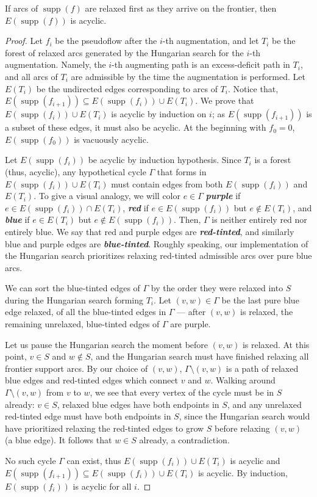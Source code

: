 \documentclass[a4paper,UKenglish]{socg-lipics-v2018}
\def\etal{\emph{et~al.}}
\def\etal{\textit{et~al.}}
\def\supp{\operatorname{supp}}
\theoremstyle{plain}
\numberwithin{figure}{section}
\def\EMPH#1{\textbf{\emph{\boldmath #1}}}
\begin{document}
\begin{lemmarep}[(Agarwal~\etal~\cite{AFPVX17})]
\label{lemma:orlin_acyclic}
If arcs of $\supp(f)$ are relaxed first as they arrive on the frontier, then
$E(\supp(f))$ is acyclic.
\end{lemmarep}

\begin{proof}
Let $f_i$ be the pseudoflow after the $i$-th augmentation, and let $T_i$ be the
forest of relaxed arcs generated by the Hungarian search for the $i$-th
augmentation.
Namely, the $i$-th augmenting path is an excess-deficit path in $T_i$, and all
arcs of $T_i$ are admissible by the time the augmentation is performed.
Let $E(T_i)$ be the undirected edges corresponding to arcs of $T_i$.
Notice that, $E(\supp(f_{i+1})) \subseteq E(\supp(f_i)) \cup E(T_i)$.
We prove that $E(\supp(f_i)) \cup E(T_i)$ is acyclic by induction on $i$;
as $E(\supp(f_{i+1}))$ is a subset of these edges, it must also be acyclic.
At the beginning with $f_0 = 0$, $E(\supp(f_0))$ is vacuously acyclic.

Let $E(\supp(f_i))$ be acyclic by induction hypothesis.
Since $T_i$ is a forest (thus, acyclic), any hypothetical cycle $\Gamma$ that
forms in $E(\supp(f_i)) \cup E(T_i)$ must contain edges from both
$E(\supp(f_i))$ and $E(T_i)$.
To give a visual analogy, we will color $e \in \Gamma$
\EMPH{purple} if $e \in E(\supp(f_i)) \cap E(T_i)$,
\EMPH{red} if $e \in E(\supp(f_i))$ but $e \not\in E(T_i)$,
and \EMPH{blue} if $e \in E(T_i)$ but $e \not\in E(\supp(f_i))$.
Then, $\Gamma$ is neither entirely red nor entirely blue.
We say that red and purple edges are \EMPH{red-tinted}, and similarly blue and
purple edges are \EMPH{blue-tinted}.
Roughly speaking, our implementation of the Hungarian search prioritizes
relaxing red-tinted admissible arcs over pure blue arcs. %

We can sort the blue-tinted edges of $\Gamma$ by the order they were relaxed
into $S$ during the Hungarian search forming $T_i$.
Let $(v, w) \in \Gamma$ be the last pure blue edge relaxed, of all the
blue-tinted edges in $\Gamma$ --- after $(v, w)$ is relaxed, the remaining
unrelaxed, blue-tinted edges of $\Gamma$ are purple.

Let us pause the Hungarian search the moment before $(v, w)$ is relaxed.
At this point, $v \in S$ and $w \not\in S$, and the Hungarian search must have
finished relaxing all frontier support arcs.
By our choice of $(v, w)$, $\Gamma \setminus (v, w)$ is a path of relaxed blue
edges and red-tinted edges which connect $v$ and $w$.
Walking around $\Gamma \setminus (v, w)$ from $v$ to $w$, we see that every
vertex of the cycle must be in $S$ already: $v \in S$, relaxed blue edges have
both endpoints in $S$, and any unrelaxed red-tinted edge must have both
endpoints in $S$, since the Hungarian search would have prioritized relaxing
the red-tinted edges to grow $S$ before relaxing $(v, w)$ (a blue edge).
It follows that $w \in S$ already, a contradiction.

No such cycle $\Gamma$ can exist, thus $E(\supp(f_i)) \cup E(T_i)$ is acyclic
and $E(\supp(f_{i+1})) \subseteq E(\supp(f_i)) \cup E(T_i)$ is acyclic.
By induction, $E(\supp(f_i))$ is acyclic for all $i$.
\end{proof}
\end{document}
